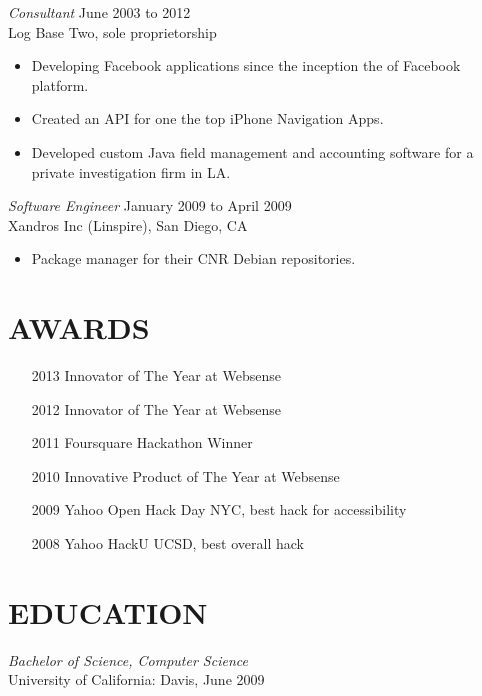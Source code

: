 \documentclass[margin]{res}
\begin{document}
\begin{resume}
        {\sl Consultant} \hfill  June 2003 to 2012 \\
        Log Base Two, sole proprietorship
        \begin{itemize}  \itemsep -2pt %
             \item Developing Facebook applications since the inception the of Facebook platform.
             \item Created an API for one the top iPhone Navigation Apps.
             \item Developed custom Java field management and accounting software for a private investigation firm in LA.
        \end{itemize}
        
		{\sl Software Engineer} \hfill  January 2009 to April 2009 \\
        Xandros Inc (Linspire), San Diego, CA
        \begin{itemize}  \itemsep -2pt %
            \item Package manager for their CNR Debian repositories.
        \end{itemize}
\section{AWARDS}
        \begin{itemize} \itemsep -2pt
            \item[2013]{Innovator of The Year at Websense}
            \item[2012]{Innovator of The Year at Websense}
            \item[2011]{Foursquare Hackathon Winner}
            \item[2010]{Innovative Product of The Year at Websense}
            \item[2009]{Yahoo Open Hack Day NYC, best hack for accessibility} 
		        \item[2008]{Yahoo HackU UCSD, best overall hack}
        \end{itemize}
\section{EDUCATION} {\sl Bachelor of Science, Computer Science}\\
        University of California: Davis, June 2009\\

\end{resume}
\end{document}
